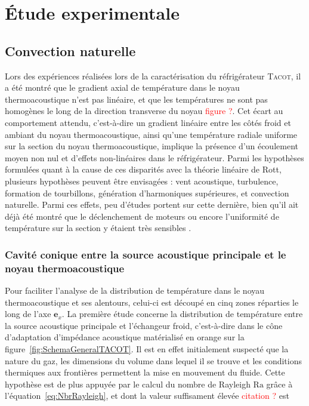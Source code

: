 \chapter{\'Etude experimentale}\label{chap:EtudeExpe}
\mylocaltoc

\section{Convection naturelle}\label{chap:EtudeExpe_ConvNat}
Lors des expériences réalisées lors de la caractérisation du réfrigérateur \textsc{Tacot}, il a été montré que le gradient axial de température dans le noyau thermoacoustique n'est pas linéaire, et que les températures ne sont pas homogènes le long de la direction transverse du noyau \textcolor{red}{figure ?}\cite{ramadan_design_2021}. Cet écart au comportement attendu, c'est-à-dire un gradient linéaire entre les côtés froid et ambiant du noyau thermoacoustique, ainsi qu'une température radiale uniforme sur la section du noyau thermoacoustique, implique la présence d'un écoulement moyen non nul et d'effets non-linéaires dans le réfrigérateur. Parmi les hypothèses formulées quant à la cause de ces disparités avec la théorie linéaire de Rott, plusieurs hypothèses peuvent être envisagées : vent acoustique, turbulence, formation de tourbillons, génération d'harmoniques supérieures, et convection naturelle. Parmi ces effets, peu d'études portent sur cette dernière, bien qu'il ait déjà été montré que le déclenchement de moteurs ou encore l'uniformité de température sur la section y étaient très sensibles \cite{ross_influence_2003,  hireche_numerical_2019, ramadan_experimental_2018,  zhang_novel_2011}.

\subsection{Cavité conique entre la source acoustique principale et le noyau thermoacoustique}

Pour faciliter l'analyse de la distribution de température dans le noyau thermoacoustique et ses alentours, celui-ci est découpé en cinq zones réparties le long de l'axe $\mathbf{e}_x$.
La première étude concerne la distribution de température entre la source acoustique principale et l'échangeur froid, c'est-à-dire dans le cône d'adaptation d'impédance acoustique matérialisé en orange sur la figure~\ref{fig:SchemaGeneralTACOT}. Il est en effet initialement suspecté que la nature du gaz, les dimensions du volume dans lequel il se trouve et les conditions thermiques aux frontières permettent la mise en mouvement du fluide. Cette hypothèse est de plus appuyée par le calcul du nombre de Rayleigh $\mathrm{Ra}$ grâce à l'équation~\eqref{eq:NbrRayleigh}, et dont la valeur suffisament élevée \textcolor{red}{citation ?} est

